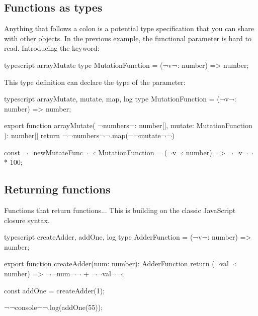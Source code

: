 \begin{console}
\end{console}



\subsection{Functions as types}

Anything that follows a colon is a potential type specification that you can share with other objects. In the previous example, the  functional parameter is hard to read. Introducing the  keyword:

\begin{monokai}{typescript}{
        arrayMutate
    }
    type MutationFunction = (¬v¬: number) => number;
\end{monokai}

This  type definition can declare the type of the  parameter:

\begin{monokai}{typescript}{
        arrayMutate,
        mutate,
        map,
        log
    }
    type MutationFunction = (¬v¬: number) => number;

    export function arrayMutate(
        ¬numbers¬: number[],
        mutate: MutationFunction
    ): number[] {
        return ¬¬numbers¬¬.map(¬¬mutate¬¬)
    }

    const ¬¬newMutateFunc¬¬: MutationFunction = (¬v¬: number) => ¬¬v¬¬ * 100;
\end{monokai}



\subsection{Returning functions}

Functions that return functions... This is building on the classic JavaScript closure syntax.

\begin{monokai}{typescript}{
        createAdder,
        addOne,
        log
    }
    type AdderFunction = (¬v¬: number) => number;
    
    export function createAdder(num: number): AdderFunction {
        return (¬val¬: number) => ¬¬num¬¬ + ¬¬val¬¬;
    }
    
    const addOne = createAdder(1);
    
    ¬¬console¬¬.log(addOne(55));
\end{monokai}

